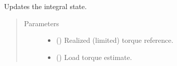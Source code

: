 \documentclass[letterpaper,10pt,english]{sphinxmanual}
\begin{document}
\begin{fulllineitems}
\begin{fulllineitems}
\begin{quote}
\begin{description}
\end{description}\end{quote}

\end{fulllineitems}


\begin{fulllineitems}
\label{\detokenize{control:control.common.SpeedCtrl.update}}
\pysigstartsignatures
{}
\pysigstopsignatures
\sphinxAtStartPar
Updates the integral state.
\begin{quote}\begin{description}
\item[{Parameters}] \leavevmode\begin{itemize}
\item {} 
\sphinxAtStartPar
{} () \textendash{} Realized (limited) torque reference.

\item {} 
\sphinxAtStartPar
{} () \textendash{} Load torque estimate.

\end{itemize}

\end{description}\end{quote}

\end{fulllineitems}


\end{fulllineitems}

\end{document}
